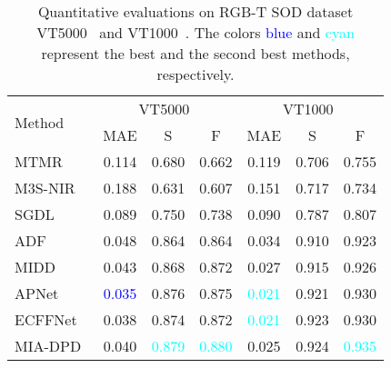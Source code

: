 \begin{table}[t]
\renewcommand\arraystretch{1.5}
\setlength\tabcolsep{5pt}
\centering
\caption{Quantitative evaluations on RGB-T SOD dataset VT5000~\cite{tu2022rgbtbench} and VT1000~\cite{tu2019rgb}.  The colors \textcolor{blue}{blue} and \textcolor{cyan}{cyan} represent the best and the second best methods, respectively.}
\label{tab:rgbt_sod}
\begin{tabular}{lcccccc} 
\toprule
\multirow{2}{*}{Method} & \multicolumn{3}{c}{VT5000~\cite{tu2022rgbtbench}}                           & \multicolumn{3}{c}{VT1000~\cite{tu2019rgb}}                            \\ 
\cmidrule[0.25pt](lr){2-4} \cmidrule[0.25pt](lr){5-7}
                        & MAE  & S & F & MAE  & S & F  \\ 
\midrule
MTMR~\cite{wang2018rgb}                    & 0.114            & 0.680         & 0.662             & 0.119            & 0.706         & 0.755               \\ 

M3S-NIR~\cite{tu2019m3s}                 & 0.188            & 0.631         & 0.607             & 0.151            & 0.717         & 0.734               \\ 

SGDL~\cite{tu2019rgb}                    & 0.089            & 0.750         & 0.738             & 0.090            & 0.787         & 0.807               \\ 

ADF~\cite{tu2022rgbtbench}                     & 0.048            & 0.864         & 0.864             & 0.034            & 0.910         & 0.923               \\ 

MIDD~\cite{tu2021multi}                    & 0.043            & 0.868         & 0.872             & 0.027            & 0.915         & 0.926               \\ 

APNet~\cite{zhou2021apnet}                   & \textcolor{blue}{0.035}            & 0.876         & 0.875             & \textcolor{cyan}{0.021}            & 0.921         & 0.930               \\ 

ECFFNet~\cite{zhou2021ecffnet}                 & 0.038            & 0.874         & 0.872             & \textcolor{cyan}{0.021}            & 0.923         & 0.930               \\ 

MIA-DPD~\cite{liang2022multi}                 & 0.040            & \textcolor{cyan}{0.879}         & \textcolor{cyan}{0.880}             & 0.025            & 0.924         & \textcolor{cyan}{0.935}               \\ 


\end{tabular}
\end{table}
